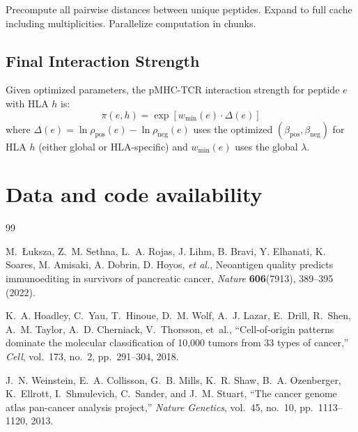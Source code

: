 \documentclass[11pt]{article}
\begin{document}
Precompute all pairwise distances between unique peptides. Expand to full cache including multiplicities. Parallelize computation in chunks.

\subsection{Final Interaction Strength}

Given optimized parameters, the pMHC-TCR interaction strength for peptide $e$ with HLA $h$ is:
\[
 \pi(e,h) = \exp\left[w_{\min}(e) \cdot \Delta(e)\right]
\]
where $\Delta(e) = \ln \rho_{\mathrm{pos}}(e) - \ln \rho_{\mathrm{neg}}(e)$ uses the optimized $(\beta_{\mathrm{pos}}, \beta_{\mathrm{neg}})$ for HLA $h$ (either global or HLA-specific) and $w_{\min}(e)$ uses the global $\lambda$. 



\section{Data and code availability}



\begin{thebibliography}{99}

M.~{\L}uksza, Z.~M. Sethna, L.~A. Rojas, J. Lihm, B. Bravi, Y. Elhanati,
K. Soares, M. Amisaki, A. Dobrin, D. Hoyos, \emph{et al.},
\newblock Neoantigen quality predicts immunoediting in survivors of pancreatic cancer,
\newblock \emph{Nature} \textbf{606}(7913), 389--395 (2022).

K.~A. Hoadley, C.~Yau, T.~Hinoue, D.~M. Wolf, A.~J. Lazar, E.~Drill, R.~Shen,
A.~M. Taylor, A.~D. Cherniack, V.~Thorsson, et~al.,
``Cell-of-origin patterns dominate the molecular classification of 10{,}000 tumors from 33 types of cancer,''
\emph{Cell}, vol.~173, no.~2, pp.~291--304, 2018.

J.~N. Weinstein, E.~A. Collisson, G.~B. Mills, K.~R. Shaw, B.~A. Ozenberger,
K.~Ellrott, I.~Shmulevich, C.~Sander, and J.~M. Stuart,
``The cancer genome atlas pan-cancer analysis project,''
\emph{Nature Genetics}, vol.~45, no.~10, pp.~1113--1120, 2013.


\end{thebibliography}
\end{document}
